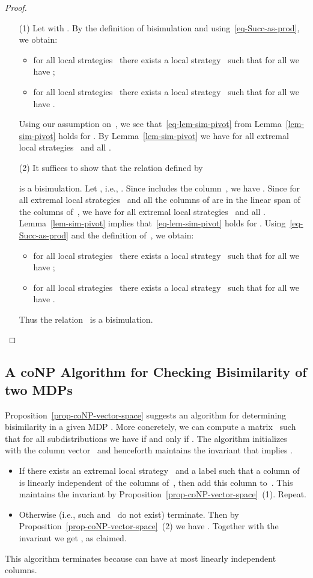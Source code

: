 \begin{proof}\leavevmode
\begin{itemize}[align=left]
\item[(1)]
Let  with .
By the definition of bisimulation and using~\eqref{eq-Succ-as-prod}, we obtain:
\begin{itemize}
\item for all local strategies~ there exists a local strategy~ such that for all  we have ;
\item for all local strategies~ there exists a local strategy~ such that for all  we have .
\end{itemize}
Using our assumption on~, we see that~\eqref{eq-lem-sim-pivot} from Lemma~\ref{lem-sim-pivot} holds for .
By Lemma~\ref{lem-sim-pivot} we have  for all extremal local strategies~ and all .
\item[(2)]
It suffices to show that the relation  defined by

is a bisimulation.
Let , i.e., .
Since  includes the column~, we have .
Since for all extremal local strategies~ and all  the columns of  are in the linear span of the columns of~, we have  for all extremal local strategies~ and all .
Lemma~\ref{lem-sim-pivot} implies that~\eqref{eq-lem-sim-pivot} holds for .
Using~\eqref{eq-Succ-as-prod} and the definition of~, we obtain:
\begin{itemize}
\item for all local strategies~ there exists a local strategy~ such that for all  we have ;
\item for all local strategies~ there exists a local strategy~ such that for all  we have .
\end{itemize}
Thus the relation~ is a bisimulation. \qedhere
\end{itemize}
\end{proof}

\subsection{A coNP Algorithm for Checking Bisimilarity of two MDPs}\label{subsec:algo_conp_bisimilarity}

Proposition~\ref{prop-coNP-vector-space}
suggests an algorithm for determining bisimilarity in a given MDP .
More concretely, we can compute a matrix~ such that for all subdistributions  we have  if and only if .
The algorithm initializes~ with the column vector~ and henceforth maintains the invariant that  implies .
\begin{itemize}
\item
If there exists an extremal local strategy~ and a label  such that a column of  is linearly independent of the columns of~, then add this column to~.
This maintains the invariant by Proposition~\ref{prop-coNP-vector-space}~(1).
Repeat.
\item
Otherwise (i.e., such  and~ do not exist) terminate.
Then by Proposition~\ref{prop-coNP-vector-space}~(2) we have .
Together with the invariant we get , as claimed.
\end{itemize}
This algorithm terminates because  can have at most  linearly independent columns.

